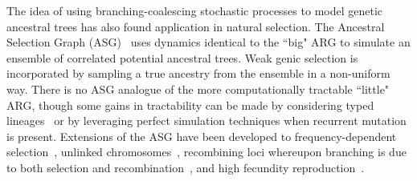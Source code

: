 \documentclass{article}
\begin{document}
The idea of using branching-coalescing stochastic processes
to model genetic ancestral trees has also found application in natural selection.
The Ancestral Selection Graph (ASG)~\citep{krone1997ancestral,neuhauser1997genealogy}
uses dynamics identical to the ``big" ARG to simulate an ensemble of correlated
potential ancestral trees. Weak genic selection is incorporated by sampling a
true ancestry from the ensemble in a non-uniform way.
There is no ASG analogue of the more computationally tractable ``little" ARG,
though some gains in tractability can be made by considering typed
lineages~\citep{etheridge2009coalescent} or by leveraging perfect simulation
techniques when recurrent mutation is present\citep{fearnhead2001perfect}.
Extensions of the ASG have been developed to frequency-dependent
selection~\citep{neuhauser1999ancestral, gonzalezcasanova2018duality},
unlinked chromosomes~\citep{fearnhead2003ancestral}, recombining
loci whereupon branching is due to both selection and
recombination~\citep{donnelly1999genealogical}, and high fecundity
reproduction~\citep{gonzalezcasanova2018duality, koskela2019robust}.
\end{document}
